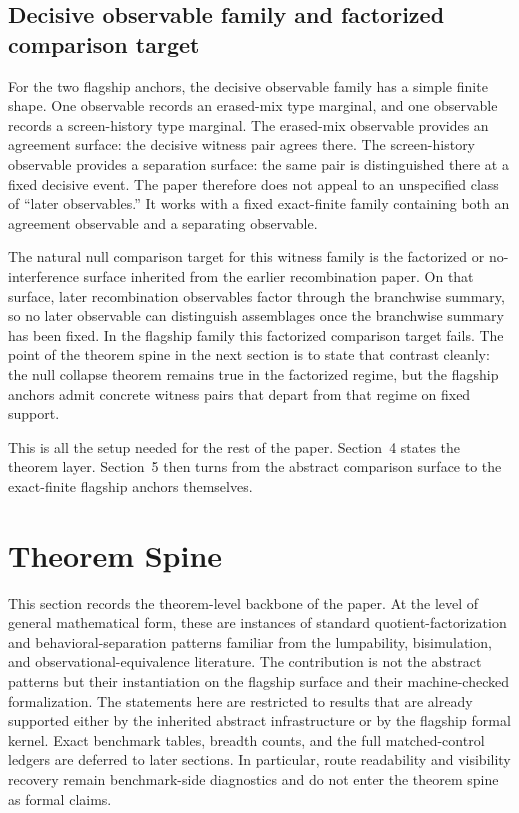 \documentclass[11pt]{article}
\theoremstyle{definition}
\begin{document}
\subsection{Decisive observable family and factorized comparison target}

For the two flagship anchors, the decisive observable family has a simple finite shape. One observable records an erased-mix type marginal, and one observable records a screen-history type marginal. The erased-mix observable provides an agreement surface: the decisive witness pair agrees there. The screen-history observable provides a separation surface: the same pair is distinguished there at a fixed decisive event. The paper therefore does not appeal to an unspecified class of ``later observables.'' It works with a fixed exact-finite family containing both an agreement observable and a separating observable.

The natural null comparison target for this witness family is the factorized or no-interference surface inherited from the earlier recombination paper. On that surface, later recombination observables factor through the branchwise summary, so no later observable can distinguish assemblages once the branchwise summary has been fixed. In the flagship family this factorized comparison target fails. The point of the theorem spine in the next section is to state that contrast cleanly: the null collapse theorem remains true in the factorized regime, but the flagship anchors admit concrete witness pairs that depart from that regime on fixed support.

This is all the setup needed for the rest of the paper. Section~4 states the theorem layer. Section~5 then turns from the abstract comparison surface to the exact-finite flagship anchors themselves.

\section{Theorem Spine}

This section records the theorem-level backbone of the paper. At the level of general mathematical form, these are instances of standard quotient-factorization and behavioral-separation patterns familiar from the lumpability, bisimulation, and observational-equivalence literature. The contribution is not the abstract patterns but their instantiation on the flagship surface and their machine-checked formalization. The statements here are restricted to results that are already supported either by the inherited abstract infrastructure or by the flagship formal kernel. Exact benchmark tables, breadth counts, and the full matched-control ledgers are deferred to later sections. In particular, route readability and visibility recovery remain benchmark-side diagnostics and do not enter the theorem spine as formal claims.
\end{document}
